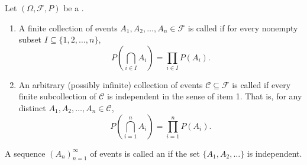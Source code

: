 \begin{definition} \label{definition:independence_of_events}
Let $(\Omega, \mathcal{F}, P)$ be a .

\begin{enumerate}
    \item A finite collection of events $A_1, A_2, \dots, A_n \in \mathcal{F}$ is called  if for every nonempty subset $I \subseteq \{1, 2, \dots, n\}$,
    $$P\left(\bigcap_{i \in I} A_i\right) = \prod_{i \in I} P(A_i).$$

    \item An arbitrary (possibly infinite) collection of events $\mathcal{C} \subseteq \mathcal{F}$ is called  if every finite subcollection of $\mathcal{C}$ is independent in the sense of item 1. That is, for any distinct $A_1, A_2, \dots, A_n \in \mathcal{C}$,
    $$P\left(\bigcap_{i=1}^n A_i\right) = \prod_{i=1}^n P(A_i).$$
\end{enumerate}

A sequence $(A_n)_{n=1}^\infty$ of events is called an  if the set $\{A_1, A_2, \dots\}$ is independent.
\end{definition}


